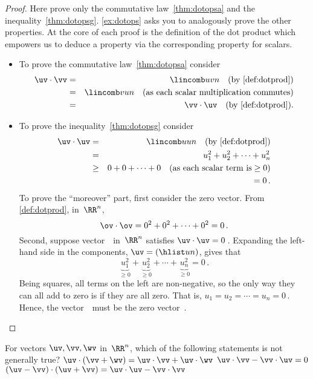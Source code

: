 \begin{proof} 
Here prove only the commutative law~\ref{thm:dotopsa} and the inequality~\ref{thm:dotopsg}.
\cref{ex:dotops} asks you to analogously prove the other properties.
At the core of each proof is the definition of the dot product which empowers us to deduce a property via the corresponding property for scalars.
\begin{itemize}
\item To prove the commutative law~\ref{thm:dotopsa} consider
\begin{eqnarray*}
\uv\cdot\vv&=&\lincomb uvn \quad(\text{by \cref{def:dotprod}})
\\&=&\lincomb vun
\quad(\text{as each scalar multiplication commutes})
\\&=&\vv\cdot\uv \quad(\text{by \cref{def:dotprod}}).
\end{eqnarray*}

\item To prove the inequality~\ref{thm:dotopsg} consider
\begin{eqnarray*}
\uv\cdot\uv&=&\lincomb uun\quad(\text{by \cref{def:dotprod}})
\\&=&u_1^2+u_2^2+\cdots+u_n^2
\\&\geq&0+0+\cdots+0 \quad(\text{as each scalar term is}\geq0)
\\&&{}=0\,.
\end{eqnarray*}
To prove the ``moreover'' part, first consider the zero vector.
From \cref{def:dotprod}, in~\(\RR^n\),
\begin{equation*}
\ov\cdot\ov={0^2+0^2+\cdots+0^2}=0\,.
\end{equation*}
Second, suppose vector~\uv\  in~\(\RR^n\) satisfies \(\uv\cdot\uv=0\)\,.
Expanding the left-hand side in the components, \(\uv=(\hlist un)\), gives that
\begin{equation*}
\underbrace{u_1^2}_{\geq0}+\underbrace{u_2^2}_{\geq0}
+\cdots+\underbrace{u_n^2}_{\geq0}=0\,.
\end{equation*}
Being squares, all terms on the left are non-negative, so the only way they can all add to zero is if they are all zero.
That is, \(u_1=u_2=\cdots=u_n=0\)\,.
Hence, the vector~\uv\ must be the zero vector~\ov.
\end{itemize}
\end{proof}


\begin{activity}
For vectors \(\uv,\vv,\wv\) in~\(\RR^n\), which of the following statements is not generally true?
{\(\uv\cdot(\vv+\wv)=\uv\cdot\vv+\uv\cdot\wv\)}
{\(\uv\cdot\vv-\vv\cdot\uv=0\)}
{\((\uv-\vv)\cdot(\uv+\vv)=\uv\cdot\uv-\vv\cdot\vv\)}
\end{activity}




